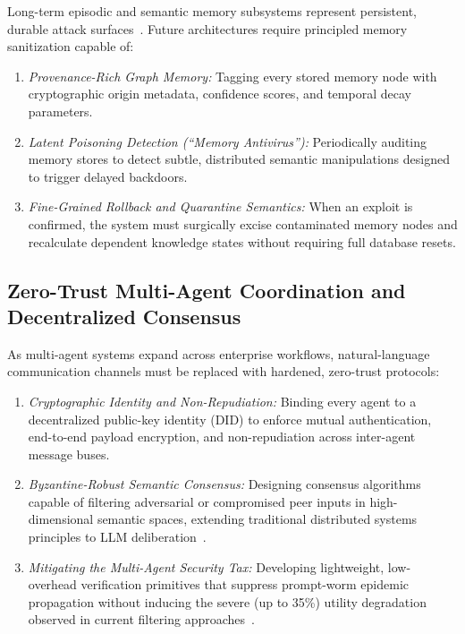 Long-term episodic and semantic memory subsystems represent persistent, durable attack surfaces~\cite{chen2024agentpoison}. Future architectures require principled memory sanitization capable of:
\begin{enumerate}
    \item \textit{Provenance-Rich Graph Memory:} Tagging every stored memory node with cryptographic origin metadata, confidence scores, and temporal decay parameters.
    \item \textit{Latent Poisoning Detection (``Memory Antivirus''):} Periodically auditing memory stores to detect subtle, distributed semantic manipulations designed to trigger delayed backdoors.
    \item \textit{Fine-Grained Rollback and Quarantine Semantics:} When an exploit is confirmed, the system must surgically excise contaminated memory nodes and recalculate dependent knowledge states without requiring full database resets.
\end{enumerate}

\subsection{Zero-Trust Multi-Agent Coordination and Decentralized Consensus}
\label{subsec:zero_trust_mas}

As multi-agent systems expand across enterprise workflows, natural-language communication channels must be replaced with hardened, zero-trust protocols:
\begin{enumerate}
    \item \textit{Cryptographic Identity and Non-Repudiation:} Binding every agent to a decentralized public-key identity (DID) to enforce mutual authentication, end-to-end payload encryption, and non-repudiation across inter-agent message buses.
    \item \textit{Byzantine-Robust Semantic Consensus:} Designing consensus algorithms capable of filtering adversarial or compromised peer inputs in high-dimensional semantic spaces, extending traditional distributed systems principles to LLM deliberation~\cite{chen2024blockagents}.
    \item \textit{Mitigating the Multi-Agent Security Tax:} Developing lightweight, low-overhead verification primitives that suppress prompt-worm epidemic propagation without inducing the severe (up to 35\%) utility degradation observed in current filtering approaches~\cite{peigne2025multi}.
\end{enumerate}

